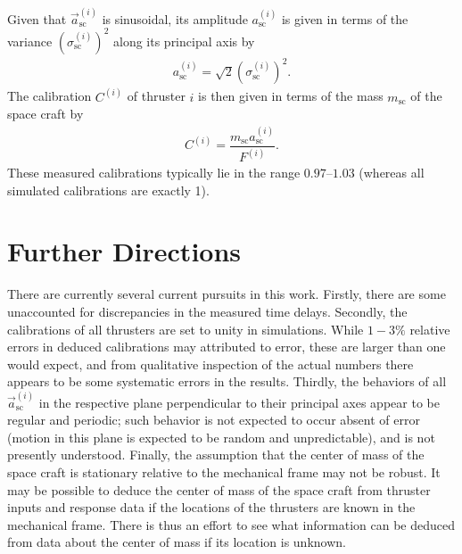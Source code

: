 \documentclass[10pt,twocolumn]{article}
\renewcommand{\t}{\text} %
\newcommand{\f}[2]{\dfrac{#1}{#2}} %
\newcommand{\p}[1]{\left(#1\right)} %
\renewcommand{\v}{\vec} %
\renewcommand{\sc}{_{\t{sc}}}
\newcommand{\ti}{^{\p{i}}}
\begin{document}
Given that $\v a\sc\ti$ is sinusoidal, its amplitude $a\sc\ti$ is
given in terms of the variance $\p{\sigma\sc\ti}^2$ along its
principal axis by
\begin{align}
  a\sc\ti=\sqrt2\p{\sigma\sc\ti}^2.
\end{align}
The calibration $C\ti$ of thruster $i$ is then given in terms of the
mass $m\sc$ of the space craft by
\begin{align}
  C\ti=\f{m\sc a\sc\ti}{F\ti}.
\end{align}
These measured calibrations typically lie in the range $0.97$--$1.03$
(whereas all simulated calibrations are exactly 1).

\section*{Further Directions}

There are currently several current pursuits in this work. Firstly,
there are some unaccounted for discrepancies in the measured time
delays. Secondly, the calibrations of all thrusters are set to unity
in simulations. While $1-3\%$ relative errors in deduced calibrations
may attributed to error, these are larger than one would expect, and
from qualitative inspection of the actual numbers there appears to be
some systematic errors in the results. Thirdly, the behaviors of all
$\v a\sc\ti$ in the respective plane perpendicular to their principal
axes appear to be regular and periodic; such behavior is not expected
to occur absent of error (motion in this plane is expected to be
random and unpredictable), and is not presently understood. Finally,
the assumption that the center of mass of the space craft is
stationary relative to the mechanical frame may not be robust. It may
be possible to deduce the center of mass of the space craft from
thruster inputs and response data if the locations of the thrusters
are known in the mechanical frame. There is thus an effort to see what
information can be deduced from data about the center of mass if its
location is unknown.
\end{document}
